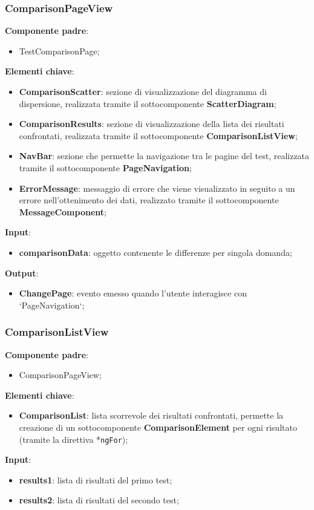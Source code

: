 \subsubsection{ComparisonPageView}  
\textbf{Componente padre}:
\begin{itemize}
    \item TestComparisonPage;
\end{itemize}
\textbf{Elementi chiave}:
\begin{itemize}
    \item \textbf{ComparisonScatter}: sezione di visualizzazione del diagramma di dispersione, realizzata tramite il sottocomponente \textbf{ScatterDiagram};
    \item \textbf{ComparisonResults}: sezione di visualizzazione della lista dei risultati confrontati, realizzata tramite il sottocomponente \textbf{ComparisonListView};
    \item \textbf{NavBar}: sezione che permette la navigazione tra le pagine del test, realizzata tramite il sottocomponente \textbf{PageNavigation};
    \item \textbf{ErrorMessage}: messaggio di errore che viene visualizzato in seguito a un errore nell'ottenimento dei dati, realizzato tramite il sottocomponente \textbf{MessageComponent};
\end{itemize}
\textbf{Input}:
\begin{itemize}
    \item \textbf{comparisonData}: oggetto contenente le differenze per singola domanda;
\end{itemize}
\textbf{Output}:
\begin{itemize}
    \item \textbf{ChangePage}: evento emesso quando l'utente interagisce con `PageNavigation`;
\end{itemize}
\subsubsection{ComparisonListView}
\textbf{Componente padre}:
\begin{itemize}
    \item ComparisonPageView;
\end{itemize}
\textbf{Elementi chiave}:
\begin{itemize}
    \item \textbf{ComparisonList}: lista scorrevole dei risultati confrontati, permette la creazione di un sottocomponente \textbf{ComparisonElement} per ogni risultato (tramite la direttiva *\texttt{ngFor});
\end{itemize}
\textbf{Input}:
\begin{itemize}
    \item \textbf{results1}: lista di risultati del primo test;
    \item \textbf{results2}: lista di risultati del secondo test;
\end{itemize}
